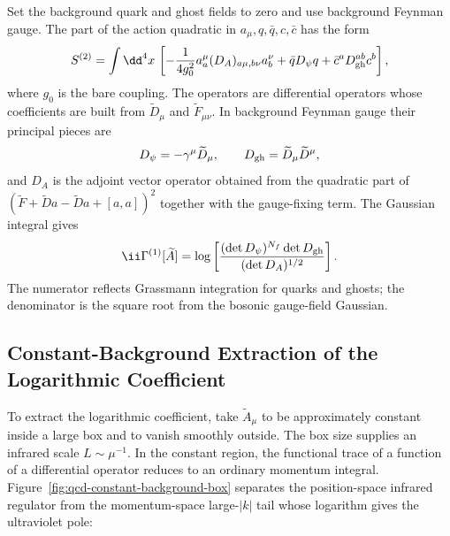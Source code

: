 Set the background quark and ghost fields to zero and use background Feynman
gauge.  The part of the action quadratic in \(a_\mu,q,\bar q,c,\bar c\) has
the form
\begin{equation}
  S^{(2)}
  =
  \int\dd^4x\,
  \left[
    -\frac1{4g_0^2}a^\mu_a(D_A)_{a\mu,b\nu}a^\nu_b
    +\bar q D_\psi q
    +\bar c^aD_{\rm gh}^{ab}c^b
  \right],
  \label{eq:qcd-background-quadratic-action}
\end{equation}
where \(g_0\) is the bare coupling.  The operators are differential operators
whose coefficients are built from \(\widetilde D_\mu\) and
\(\widetilde F_{\mu\nu}\).  In background Feynman gauge their principal
pieces are
\[
  D_\psi=-\gamma^\mu\widetilde D_\mu,\qquad
  D_{\rm gh}=\widetilde D_\mu\widetilde D^\mu,
\]
and \(D_A\) is the adjoint vector operator obtained from the quadratic part of
\((\widetilde F+\widetilde D a-\widetilde D a+[a,a])^2\) together with
the gauge-fixing term.  The Gaussian integral gives
\begin{equation}
  \ii\Gamma^{(1)}[\widetilde A]
  =
  \log
  \left[
    \frac{(\det D_\psi)^{N_f}\det D_{\rm gh}}
    {(\det D_A)^{1/2}}
  \right].
  \label{eq:qcd-background-determinant-ratio}
\end{equation}
The numerator reflects Grassmann integration for quarks and ghosts; the
denominator is the square root from the bosonic gauge-field Gaussian.

\subsection{Constant-Background Extraction of the Logarithmic Coefficient}
\label{subsec:qcd-constant-background-log-extraction}

To extract the logarithmic coefficient, take \(\widetilde A_\mu\) to be
approximately constant inside a large box and to vanish smoothly outside.
The box size supplies an infrared scale \(L\sim\mu^{-1}\).  In the constant
region, the functional trace of a function of a differential operator reduces
to an ordinary momentum integral.  Figure~\ref{fig:qcd-constant-background-box}
separates the position-space infrared regulator from the momentum-space
large-\(|k|\) tail whose logarithm gives the ultraviolet pole:

